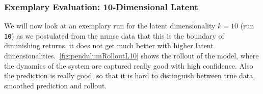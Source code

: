 %

		\subsubsection{Exemplary Evaluation: 10-Dimensional Latent}
			\label{subsubsec:pendulumL10}

			We will now look at an exemplary run for the latent dimensionality \( k = 10 \) (run \texttt{10}) as we postulated from the \ac{nrmse} data that this is the boundary of diminishing returns, \ie it does not get much better with higher latent dimensionalities.~\autoref{fig:pendulumRolloutL10} shows the rollout of the model, where the dynamics of the system are captured really good with high confidence. Also the prediction is really good, so that it is hard to distinguish between true data, smoothed prediction and rollout.

